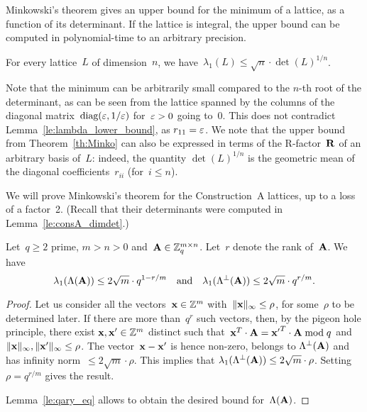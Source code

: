 Minkowski's theorem gives an upper bound for the minimum of a lattice, as a function of its determinant. If the lattice is integral, the
upper bound can be computed in polynomial-time to an arbitrary precision. 

\begin{theorem}
\label{th:Minko}
For every lattice~$L$ of dimension~$n$, we have~$\lambda_1(L) \leq \sqrt{n} \cdot \det(L)^{1/n}$.
\end{theorem}

Note that the minimum can be arbitrarily small compared to the $n$-th root of the determinant, as can be seen from the lattice
spanned by the columns of the diagonal matrix~$\mbox{diag}(\varepsilon, 1/\varepsilon)$ for~$\varepsilon>0$ going to~$0$. This does not contradict Lemma~\ref{le:lambda_lower_bound}, as $r_{11} = \varepsilon$. We note that the upper bound from Theorem~\ref{th:Minko} can 
also be expressed in terms of the R-factor~${\bf R}$  of an arbitrary basis of~$L$: 
indeed, the quantity $\det(L)^{1/n}$ is the geometric mean of the diagonal coefficients~$r_{ii}$ (for~$i \leq n$). 

We will prove Minkowski's theorem for the Construction~A lattices, up to a loss of a factor~2. (Recall that their determinants were computed in Lemma~\ref{le:consA_dimdet}.)

\begin{lemma}
\label{le:Minko_constA}
Let~$q\geq 2$ prime, $m>n>0$ and~${\bf A} \in \mathbb{Z}_q^{m \times n}$. Let~$r$ 
denote the rank of~${\bf A}$. 
We have 
\[
\lambda_1( \Lambda({\bf A}))  \leq 
 2\sqrt{m}  \cdot  q^{1-r/m} \ \  \mbox{ and } \ \ 
\lambda_1 (\Lambda^{\perp}({\bf A})) \leq  2 \sqrt{m} \cdot  q^{r/m}.
\]
\end{lemma}


\begin{proof}
 Let us consider all the vectors~${\bf x} \in \mathbb{Z}^m$ with~$\|{\bf x}\|_\infty \leq \rho$, for some~$\rho$ to be determined later. If there are more than~$q^r$ such vectors, then, by the pigeon hole principle,  
there exist ${\bf x}, {\bf x}' \in \mathbb{Z}^m$ distinct such that~${\bf x}^T \cdot {\bf A} =  {\bf x'}^T \cdot {\bf A} \bmod q$ and~$\|{\bf x}\|_\infty,\|{\bf x}'\|_\infty \leq \rho$. The vector~${\bf x} - {\bf x}'$ is hence non-zero, belongs to $\Lambda^{\perp}({\bf A})$ and has infinity norm~$\leq 2 \sqrt{m} \cdot \rho$. This implies that  $\lambda_1(\Lambda^{\perp}({\bf A})) \leq 2 \sqrt{m} \cdot  \rho$. 
Setting~$\rho = q^{r/m}$ gives the result. 

Lemma~\ref{le:qary_eq} allows to obtain the desired bound for~$\Lambda({\bf A})$.
\end{proof}

